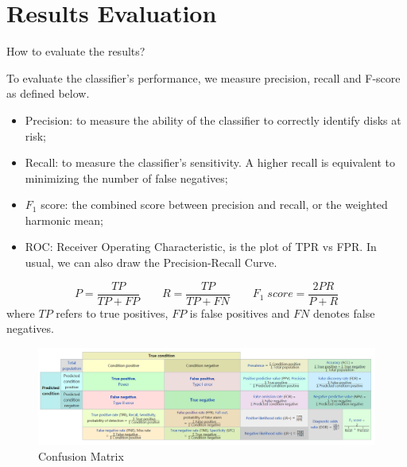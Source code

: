 \documentclass[12pt,a4paper,english]{amsart}
\begin{document}
\section{Results Evaluation}

How to evaluate the results?

To evaluate the classifier's performance, we measure precision, recall and F-score as defined below.
\begin{itemize}
	\item Precision: to measure the ability of the classifier to correctly identify disks at risk;
	\item Recall: to measure the classifier's sensitivity. A higher recall is equivalent to minimizing the number of false negatives;
	\item $F_1$ score: the combined score between precision and recall, or the weighted harmonic mean;
	\item ROC: Receiver Operating Characteristic, is the plot of TPR vs FPR. In usual, we can also draw the Precision-Recall Curve.
\end{itemize}

\begin{equation}
	P = \dfrac{TP}{TP+FP} \quad\quad 
	R = \dfrac{TP}{TP+FN} \quad\quad 
	F_{1}\; score = \dfrac{2PR}{P+R}
\end{equation}
where $TP$ refers to true positives, $FP$ is false positives and $FN$ denotes false negatives.




\begin{figure}[htb]
	\centering
	\includegraphics[width=\textwidth]{img/auc.PNG}
	\caption{Confusion Matrix\cite{Wiki}}
\end{figure}
%
\end{document}
